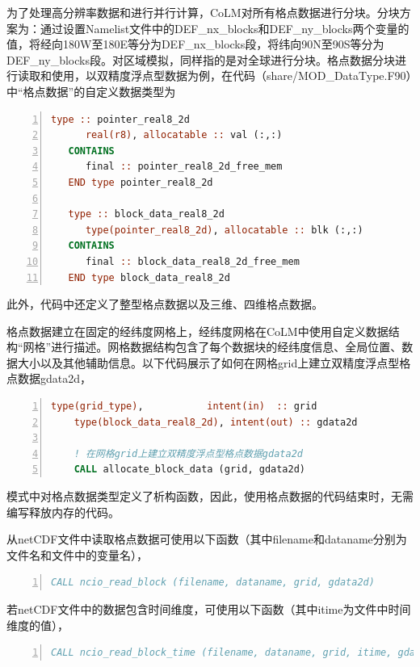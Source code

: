 \documentclass[a4paper,12pt,twoside]{article}
\begin{document}
为了处理高分辨率数据和进行并行计算，CoLM对所有格点数据进行分块。分块方案为：通过设置Namelist文件中的DEF\_nx\_blocks和DEF\_ny\_blocks两个变量的值，将经向180\textdegree W至180\textdegree E等分为DEF\_nx\_blocks段，将纬向90\textdegree N至90\textdegree S等分为DEF\_ny\_blocks段。对区域模拟，同样指的是对全球进行分块。格点数据分块进行读取和使用，以双精度浮点型数据为例，在代码（share/MOD\_DataType.F90）中“格点数据”的自定义数据类型为
\begin{lstlisting}[language=fortran, basicstyle=\linespread{1.0}\footnotesize\ttfamily, commentstyle=\color{olive}, numbers=left, numberstyle=\tiny, xleftmargin=1.5em,xrightmargin=0em, aboveskip=1em]
   type :: pointer_real8_2d
      real(r8), allocatable :: val (:,:)
   CONTAINS
      final :: pointer_real8_2d_free_mem
   END type pointer_real8_2d

   type :: block_data_real8_2d
      type(pointer_real8_2d), allocatable :: blk (:,:)
   CONTAINS
      final :: block_data_real8_2d_free_mem
   END type block_data_real8_2d
\end{lstlisting}
此外，代码中还定义了整型格点数据以及三维、四维格点数据。

格点数据建立在固定的经纬度网格上，经纬度网格在CoLM中使用自定义数据结构“网格”进行描述。网格数据结构包含了每个数据块的经纬度信息、全局位置、数据大小以及其他辅助信息。以下代码展示了如何在网格grid上建立双精度浮点型格点数据gdata2d，
\begin{lstlisting}[language=fortran, basicstyle=\linespread{1.0}\footnotesize\ttfamily, commentstyle=\color{olive}, numbers=left, numberstyle=\tiny, xleftmargin=1.5em,xrightmargin=0em, aboveskip=1em]
    type(grid_type),           intent(in)  :: grid
    type(block_data_real8_2d), intent(out) :: gdata2d

    ! 在网格grid上建立双精度浮点型格点数据gdata2d
    CALL allocate_block_data (grid, gdata2d)
\end{lstlisting}
模式中对格点数据类型定义了析构函数，因此，使用格点数据的代码结束时，无需编写释放内存的代码。

从netCDF文件中读取格点数据可使用以下函数（其中filename和dataname分别为文件名和文件中的变量名），
\begin{lstlisting}[language=fortran, basicstyle=\linespread{1.0}\footnotesize\ttfamily, commentstyle=\color{olive}, numbers=left, numberstyle=\tiny, xleftmargin=1.5em,xrightmargin=0em, aboveskip=1em]
   CALL ncio_read_block (filename, dataname, grid, gdata2d)
\end{lstlisting}

若netCDF文件中的数据包含时间维度，可使用以下函数（其中itime为文件中时间维度的值），
\begin{lstlisting}[language=fortran, basicstyle=\linespread{1.0}\footnotesize\ttfamily, commentstyle=\color{olive}, numbers=left, numberstyle=\tiny, xleftmargin=1.5em,xrightmargin=0em, aboveskip=1em]
   CALL ncio_read_block_time (filename, dataname, grid, itime, gdata2d)
\end{lstlisting}
\end{document}
